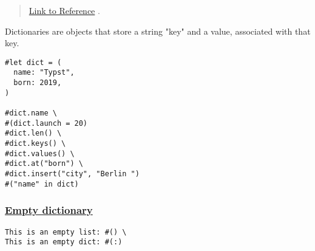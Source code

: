 \begin{quote}
\href{https://typst.app/docs/reference/foundations/dictionary/}{Link to
Reference} .
\end{quote}

Dictionaries are objects that store a string "key" and a value,
associated with that key.

\begin{verbatim}
#let dict = (
  name: "Typst",
  born: 2019,
)

#dict.name \
#(dict.launch = 20)
#dict.len() \
#dict.keys() \
#dict.values() \
#dict.at("born") \
#dict.insert("city", "Berlin ")
#("name" in dict)
\end{verbatim}

\pandocbounded{}

\subsubsection{\texorpdfstring{\hyperref[empty-dictionary]{Empty
dictionary}}{Empty dictionary}}\label{empty-dictionary}

\begin{verbatim}
This is an empty list: #() \
This is an empty dict: #(:)
\end{verbatim}

\pandocbounded{}
